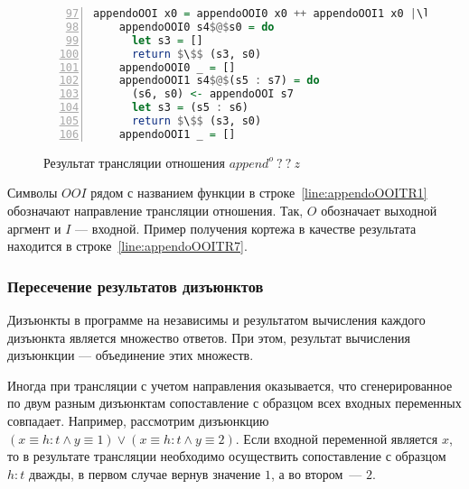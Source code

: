 \begin{figure}[h!]
  \begin{center}
  \begin{minipage}{0.7\textwidth}
  \begin{lstlisting}[language=Haskell, frame=single, numbers=left,numberstyle=\small, firstnumber=97, escapechar=|]
    appendoOOI x0 = appendoOOI0 x0 ++ appendoOOI1 x0 |\label{line:appendoOOITR1}|
    appendoOOI0 s4$@$s0 = do                         |\label{line:appendoOOITR2}|
      let s3 = []                                    |\label{line:appendoOOITR3}|
      return $\$$ (s3, s0)                           |\label{line:appendoOOITR4}|
    appendoOOI0 _ = []                               |\label{line:appendoOOITR5}|
    appendoOOI1 s4$@$(s5 : s7) = do                  |\label{line:appendoOOITR6}|
      (s6, s0) <- appendoOOI s7                      |\label{line:appendoOOITR7}|
      let s3 = (s5 : s6)                             |\label{line:appendoOOITR8}|
      return $\$$ (s3, s0)                           |\label{line:appendoOOITR9}|
    appendoOOI1 _ = []                               |\label{line:appendoOOITR10}|
    \end{lstlisting}
  \end{minipage}
  \end{center}
  \caption{Результат трансляции отношения $append^o \ ? \ ? \ z$}
  \label{lst:appendoOOITR}
\end{figure}

Символы $OOI$ рядом с названием функции в строке~\ref{line:appendoOOITR1} обозначают направление трансляции отношения.
Так, $O$ обозначает выходной аргмент и $I$ --- входной.
Пример получения кортежа в качестве результата находится в строке~\ref{line:appendoOOITR7}.


\subsubsection{Пересечение результатов дизъюнктов}

Дизъюнкты в программе на \miniKanren{} независимы и результатом вычисления каждого дизъюнкта является множество ответов.
При этом, результат вычисления дизъюнкции --- объединение этих множеств.

Иногда при трансляции с учетом направления оказывается, что сгенерированное по двум разным дизъюнктам сопоставление с образцом всех входных переменных совпадает. 
Например, рассмотрим дизъюнкцию $(x \equiv h:t \wedge y \equiv 1) \vee (x \equiv h:t \wedge y \equiv 2)$. 
Если входной переменной является $x$, то в результате трансляции необходимо осуществить сопоставление с образцом $h:t$ дважды, в первом случае вернув значение $1$, а во втором~--- $2$.

